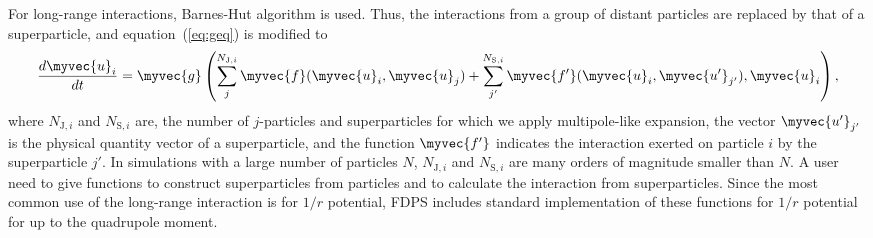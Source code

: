 For  long-range interactions, Barnes-Hut algorithm is used. Thus, the
interactions from a group of distant particles are replaced by that of
a superparticle, and  equation~(\ref{eq:geq}) is modified to 
\begin{eqnarray}
  \frac{d\myvec{u}_i}{dt} = \myvec{g}\left( \sum_j^{N_{\mathrm{J},i}}
  \myvec{f}(\myvec{u}_i,\myvec{u}_j) + \sum_{j'}^{N_{\mathrm{S},i}}
  \myvec{f'}(\myvec{u}_i,\myvec{u'}_{j'}), \myvec{u}_i
  \right), \label{eq:geqL}
\end{eqnarray}
where $N_{\mathrm{J},i}$ and $N_{\mathrm{S},i}$ are, the number of
$j$-particles and superparticles for which we apply multipole-like
expansion, the vector $\myvec{u'}_{j'}$ is the physical quantity
vector of a superparticle, and the function $\myvec{f'}$ indicates the
interaction exerted on particle $i$ by the superparticle $j'$. In
simulations with a large number of particles $N$, $N_{\mathrm{J},i}$
and $N_{\mathrm{S},i}$ are many orders of magnitude smaller than $N$.
A user need to give functions to construct superparticles from
particles and to calculate the interaction from superparticles. Since
the most common use of the long-range interaction is for $1/r$
potential, FDPS includes standard implementation of these functions
for $1/r$ potential for  up to the quadrupole moment.




